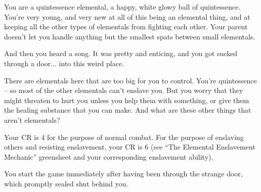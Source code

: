 \documentclass[char]{elementals}
\begin{document}
\name{\cNewQ{}}

You are a quintessence elemental, a happy, white glowy ball of quintessence.  You're very young, and very new at all of this being an elemental thing, and at keeping all the other types of elementals from fighting each other.  Your parent doesn't let you handle anything but the smallest spats between small elementals.

And then you heard a song.  It was pretty and enticing, and you got sucked through a door... into this weird place.

There are elementals here that are too big for you to control.  You're quintessence -- so most of the other elementals can't enslave you.  But you worry that they might threaten to hurt you unless you help them with something, or give them the healing substance \iWhite{} that you can make.  And what are these other things that aren't elementals?

Your CR is 4 for the purpose of normal combat. For the purpose of enslaving others and resisting enslavement, your CR is 6 (see ``The Elemental Enslavement Mechanic'' greensheet and your corresponding enslavement ability).

You start the game immediately after having been through the strange door, which promptly sealed shut behind you.
\end{document}

